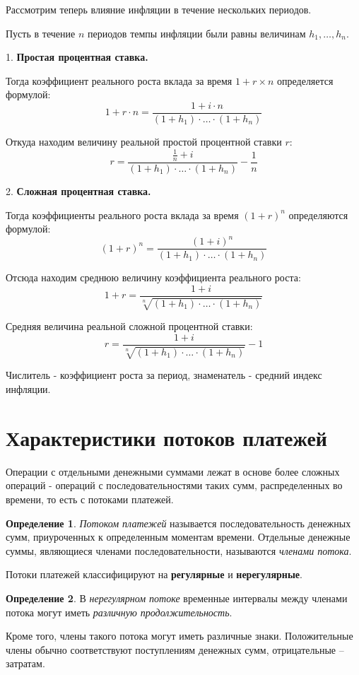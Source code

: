 \documentclass[aps,%
12pt,%
final,%
oneside,
onecolumn,%
musixtex, %
superscriptaddress,%
centertags]{article} %
\theoremstyle{plain}
\theoremstyle{definition}
\newtheorem{definition}{Определение}[subsection]
\theoremstyle{remark}
\begin{document}
Рассмотрим теперь влияние инфляции в течение нескольких периодов.

Пусть в течение $n$ периодов темпы инфляции были равны величинам $h_1,\ldots,h_n$.

1. \textbf{Простая процентная ставка.}

Тогда коэффициент реального роста вклада за время $1+r \times n$ определяется формулой:
$$1 + r \cdot n = \frac{1+i\cdot n}{(1+h_1)\cdot \ldots \cdot (1+h_n)}$$ 

Откуда находим величину реальной простой процентной ставки $r$:
$$r = \frac{\frac{1}{n} + i}{(1+h_1)\cdot \ldots \cdot (1+h_n)} - \frac{1}{n}$$ 

2. \textbf{Сложная процентная ставка.}

Тогда коэффициенты реального роста вклада за время $(1+r)^n$ определяются формулой:
$$(1+r)^n = \frac{(1+i)^n}{(1+h_1)\cdot \ldots \cdot (1+h_n)}$$

Отсюда находим среднюю величину коэффициента реального роста:
$$1 + r = \frac{1+i}{\sqrt[n]{(1+h_1)\cdot \ldots \cdot (1+h_n)}}$$

Средняя величина реальной сложной процентной ставки:
$$r = \frac{1+i}{\sqrt[n]{(1+h_1)\cdot \ldots \cdot (1+h_n)}} - 1$$

Числитель - коэффициент роста за период, знаменатель - средний индекс инфляции.


\newpage
\section{Характеристики потоков платежей}

Операции с отдельными денежными суммами лежат в основе более сложных операций - операций с последовательностями таких сумм, распределенных во времени, то есть с потоками платежей. 

\begin{definition}
\textit{Потоком платежей} называется последовательность денежных сумм, приуроченных к определенным моментам времени. Отдельные денежные суммы, являющиеся членами последовательности, называются \textit{членами потока}.
\end{definition}

Потоки платежей классифицируют на \textbf{регулярные} и \textbf{нерегулярные}.

\begin{definition}
	В \textit{нерегулярном потоке} временные интервалы между членами потока могут иметь \textit{различную продолжительность}.

	Кроме того, члены такого потока могут иметь различные знаки. Положительные члены обычно соответствуют поступлениям денежных сумм, отрицательные – затратам.
\end{definition}
\end{document}
